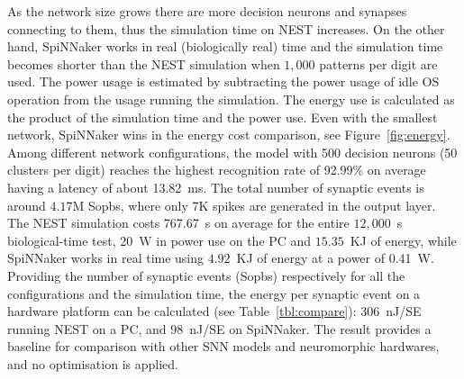 \documentclass{frontiersENG} %
\begin{document}
As the network size grows there are more decision neurons and synapses connecting to them, thus the simulation time on NEST increases.
On the other hand, SpiNNaker works in real (biologically real) time and the simulation time becomes shorter than the NEST simulation when $1,000$ patterns per digit are used.
The power usage is estimated by subtracting the power usage of idle OS operation from the usage running the simulation.
The energy use is calculated as the product of the simulation time and the power use.
Even with the smallest network, SpiNNaker wins in the energy cost comparison, see Figure~\ref{fig:energy}.
Among different network configurations, the model with 500 decision neurons (50 clusters per digit) reaches the highest recognition rate of 92.99\% on average having a latency of about 13.82~ms.
The total number of synaptic events is around $4.17$M Sopbs, where only 7K spikes are generated in the output layer. 
The NEST simulation costs 767.67~s on average for the entire $12,000$~s biological-time test, 20~W in power use on the PC and $15.35$~KJ of energy, while SpiNNaker works in real time using $4.92$~KJ of energy at a power of 0.41~W.
Providing the number of synaptic events (Sopbs) respectively for all the configurations and the simulation time, the energy per synaptic event on a hardware platform can be calculated (see Table~\ref{tbl:compare}): 
306~nJ/SE running NEST on a PC, and 98~nJ/SE on SpiNNaker.
The result provides a baseline for comparison with other SNN models and neuromorphic hardwares, and no optimisation is applied.
\end{document}
